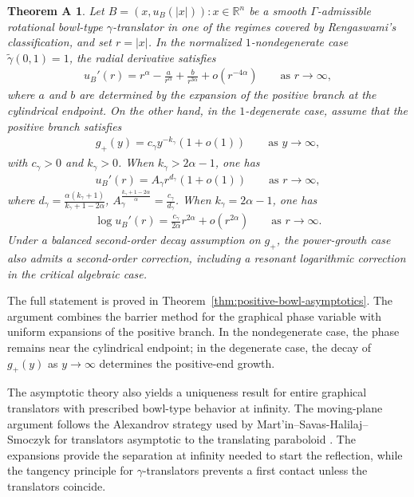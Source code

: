 \documentclass{amsart}
\theoremstyle{plain}
\theoremstyle{mainintrothm}
\newtheorem{maintheorema}{Theorem A}
\theoremstyle{definition}
\begin{document}
\medskip

\begin{maintheorema}
	\label{Thm A}
	Let $B={(x,u_B(|x|)):x\in\mathbb R^n}$ be a smooth $\Gamma$-admissible
	rotational bowl-type $\gamma$-translator in one of the regimes covered by
	Rengaswami's classification, and set $r=|x|$. In the normalized $1$-nondegenerate case $\widetilde\gamma(0,1)=1$, the
	radial derivative satisfies
	\begin{align*}
		u_B'(r)
		=
		r^\alpha
		-
		\frac{a}{r^\alpha}
		+
		\frac{b}{r^{3\alpha}}
		+
		o(r^{-4\alpha})
		\qquad
		\text{as }r\to\infty,
	\end{align*}
	where $a$ and $b$ are determined by the expansion of the positive branch at
	the cylindrical endpoint. On the other hand, in the $1$-degenerate case, assume that the positive branch satisfies
	\begin{align*}
		g_+(y)
		=
		c_\gamma y^{-k_\gamma}(1+o(1))
		\qquad
		\text{as }y\to\infty,
	\end{align*}
	with $c_\gamma>0$ and $k_\gamma>0$.  When $k_\gamma>2\alpha-1$, one has
	\begin{align*}
		u_B'(r)
		=
		A_\gamma r^{d_\gamma}(1+o(1))
		\qquad
		\text{as }r\to\infty,
	\end{align*}
	where $d_\gamma=\frac{\alpha(k_\gamma+1)}{k_\gamma+1-2\alpha}$, $A_\gamma^{\frac{k_\gamma+1-2\alpha}{\alpha}}=\frac{c_\gamma}{d_\gamma}$. When $k_\gamma=2\alpha-1$, one has
	\begin{align*}
		\log u_B'(r)
		=
		\frac{c_\gamma}{2\alpha}r^{2\alpha}
		+
		o(r^{2\alpha})
		\qquad
		\text{as }r\to\infty.
	\end{align*}
	Under a balanced second-order decay assumption on $g_+$, the power-growth
	case also admits a second-order correction, including a resonant logarithmic
	correction in the critical algebraic case.
\end{maintheorema}

\medskip

The full statement is proved in Theorem~\ref{thm:positive-bowl-asymptotics}.  The argument combines the barrier method for the graphical phase variable with uniform expansions of the positive branch.  In the nondegenerate case, the phase remains near the cylindrical endpoint; in the degenerate case, the decay of $g_+(y)$ as $y\to\infty$ determines the positive-end growth.

\medskip

The asymptotic theory also yields a uniqueness result for entire graphical
translators with prescribed bowl-type behavior at infinity.  The moving-plane
argument follows the Alexandrov strategy used by
Mart'in--Savas-Halilaj--Smoczyk for translators asymptotic to the translating
paraboloid \cite{Paco_2014}.  The expansions provide the separation at infinity
needed to start the reflection, while the tangency principle for
$\gamma$-translators \cite[Theorem~1.4]{Yo} prevents a first contact unless the
translators coincide.
\end{document}
